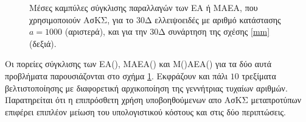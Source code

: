 \begin{figure}[h!]
\begin{minipage}[b]{0.5\linewidth}
 \centering
\end{minipage}
\begin{minipage}[b]{0.5\linewidth}
 \centering
\end{minipage}
\caption{Μέσες καμπύλες σύγκλισης παραλλαγών των ΕΑ ή ΜΑΕΑ, που χρησιμοποιούν ΑσΚΣ, για το 30Δ ελλειψοειδές με  αριθμό κατάστασης $a=1000$ (αριστερά), και για την 30Δ συνάρτηση της σχέσης \ref{mm} (δεξιά).} 
\label{ellipse_t2_pca_ipe}
\end{figure} 
\pagebreak
Οι πορείες σύγκλισης των ΕΑ(),    ΜΑΕΑ() και \linebreak Μ()ΑΕΑ() για τα δύο αυτά προβλήματα παρουσιάζονται στο σχήμα \ref{ellipse_t2_pca_ipe}. Εκφράζουν και πάλι $10$ τρεξίματα βελτιστοποίησης με διαφορετική αρχικοποίηση της γεννήτριας τυχαίων αριθμών.  Παρατηρείται ότι η επιπρόσθετη χρήση υποβοηθούμενων απο ΑσΚΣ μεταπροτύπων επιφέρει επιπλέον μείωση του υπολογιστικού κόστους και στις δύο περιπτώσεις.



